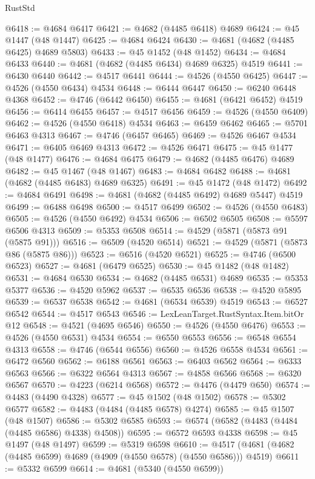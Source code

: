 \begin{lexlean}{RustStd}
\begin{coremodule}
@6418 := @4684 @6417
@6421 := @4682 (@4485 @6418) @4689
@6424 := @45 @1447 (@48 @1447)
@6425 := @4684 @6424
@6430 := @4681 (@4682 (@4485 @6425) @4689 @5803)
@6433 := @45 @1452 (@48 @1452)
@6434 := @4684 @6433
@6440 := @4681 (@4682 (@4485 @6434) @4689 @6325) @4519
@6441 := @6430 @6440
@6442 := @4517 @6441
@6444 := @4526 (@4550 @6425)
@6447 := @4526 (@4550 @6434) @4534
@6448 := @6444 @6447
@6450 := @6240 @6448 @4368
@6452 := @4746 (@6442 @6450)
@6455 := @4681 (@6421 @6452) @4519
@6456 := @6414 @6455
@6457 := @4517 @6456
@6459 := @4526 (@4550 @6409)
@6462 := @4526 (@4550 @6418) @4534
@6463 := @6459 @6462
@6465 := @5701 @6463 @4313
@6467 := @4746 (@6457 @6465)
@6469 := @4526 @6467 @4534
@6471 := @6405 @6469 @4313
@6472 := @4526 @6471
@6475 := @45 @1477 (@48 @1477)
@6476 := @4684 @6475
@6479 := @4682 (@4485 @6476) @4689
@6482 := @45 @1467 (@48 @1467)
@6483 := @4684 @6482
@6488 := @4681 (@4682 (@4485 @6483) @4689 @6325)
@6491 := @45 @1472 (@48 @1472)
@6492 := @4684 @6491
@6498 := @4681 (@4682 (@4485 @6492) @4689 @5447) @4519
@6499 := @6488 @6498
@6500 := @4517 @6499
@6502 := @4526 (@4550 @6483)
@6505 := @4526 (@4550 @6492) @4534
@6506 := @6502 @6505
@6508 := @5597 @6506 @4313
@6509 := @5353 @6508
@6514 := @4529 (@5871 (@5873 @91 (@5875 @91)))
@6516 := @6509 (@4520 @6514)
@6521 := @4529 (@5871 (@5873 @86 (@5875 @86)))
@6523 := @6516 (@4520 @6521)
@6525 := @4746 (@6500 @6523)
@6527 := @4681 (@6479 @6525)
@6530 := @45 @1482 (@48 @1482)
@6531 := @4684 @6530
@6534 := @4682 (@4485 @6531) @4689
@6535 := @5353 @5377
@6536 := @4520 @5962
@6537 := @6535 @6536
@6538 := @4520 @5895
@6539 := @6537 @6538
@6542 := @4681 (@6534 @6539) @4519
@6543 := @6527 @6542
@6544 := @4517 @6543
@6546 := LexLeanTarget.RustSyntax.Item.bitOr @12
@6548 := @4521 (@4695 @6546)
@6550 := @4526 (@4550 @6476)
@6553 := @4526 (@4550 @6531) @4534
@6554 := @6550 @6553
@6556 := @6548 @6554 @4313
@6558 := @4746 (@6544 @6556)
@6560 := @4526 @6558 @4534
@6561 := @6472 @6560
@6562 := @6188 @6561
@6563 := @6403 @6562
@6564 := @6333 @6563
@6566 := @6322 @6564 @4313
@6567 := @4858 @6566
@6568 := @6320 @6567
@6570 := @4223 (@6214 @6568)
@6572 := @4476 (@4479 @650)
@6574 := @4483 (@4490 @4328)
@6577 := @45 @1502 (@48 @1502)
@6578 := @5302 @6577
@6582 := @4483 (@4484 (@4485 @6578) @4274)
@6585 := @45 @1507 (@48 @1507)
@6586 := @5302 @6585
@6593 := @6574 (@6582 (@4483 (@4484 (@4485 @6586) @4338) @4508))
@6595 := @6572 @6593 @4338
@6598 := @45 @1497 (@48 @1497)
@6599 := @5319 @6598
@6610 := @4517 (@4681 (@4682 (@4485 @6599) @4689 (@4909 (@4550 @6578) (@4550 @6586))) @4519)
@6611 := @5332 @6599
@6614 := @4681 (@5340 (@4550 @6599))

\end{coremodule}
\end{lexlean}
